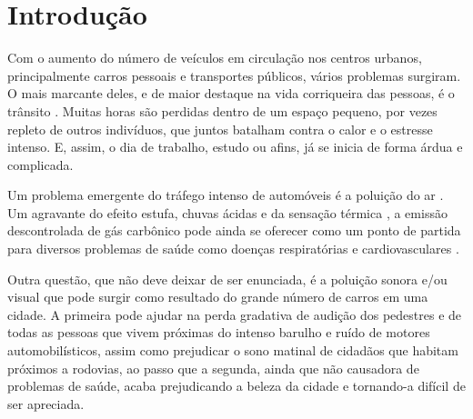 \chapter{Introdução}\label{chp:LABEL_CHP_1}

Com o aumento do número de veículos em circulação nos centros urbanos, principalmente carros pessoais e transportes públicos, vários problemas surgiram. O mais marcante deles, e de maior destaque na vida corriqueira das pessoas, é o trânsito \citep{site:1}. Muitas horas são perdidas \citep{site:2} dentro de um espaço pequeno, por vezes repleto de outros indivíduos, que juntos batalham contra o calor e o estresse intenso. E, assim, o dia de trabalho, estudo ou afins, já se inicia de forma árdua e complicada. 

\par Um problema emergente do tráfego intenso de automóveis é a poluição do ar \citep{site:3}. Um agravante do efeito estufa, chuvas ácidas e da sensação térmica \citep{site:5}, a emissão descontrolada de gás carbônico pode ainda se oferecer como um ponto de partida para diversos problemas de saúde como doenças respiratórias e cardiovasculares \citep{site:4}. 

\par Outra questão, que não deve deixar de ser enunciada, é a poluição sonora e/ou visual \citep{site:6} que pode surgir como resultado do grande número de carros em uma cidade. A primeira pode ajudar na perda gradativa de audição dos pedestres e de todas as pessoas que vivem próximas do intenso barulho e ruído de motores automobilísticos, assim como prejudicar o sono matinal de cidadãos que habitam próximos a rodovias, ao passo que a segunda, ainda que não causadora de problemas de saúde, acaba prejudicando a beleza da cidade e tornando-a difícil de ser apreciada. 

